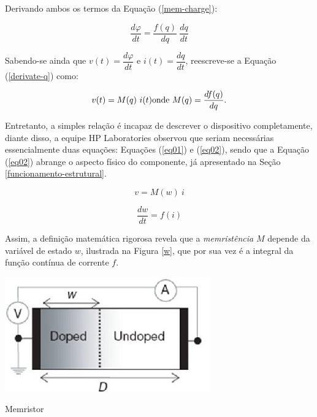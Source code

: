 \documentclass{ceel}
\begin{document}
\begin{multicols}{2}
Derivando ambos os termos da Equação (\ref{mem-charge}):

\begin{equation}\label{derivate-q}
\dfrac{d\varphi}{dt}=\dfrac{f(q)}{dq} \ \dfrac{dq}{dt}
\end{equation}

Sabendo-se ainda que $v(t)=\dfrac{d\varphi}{dt}$ e $i(t)=\dfrac{dq}{dt}$, reescreve-se a Equação (\ref{derivate-q}) como:

\begin{gather}\label{derivate-q}
v(t)=M(q)\ i(t)

\noindent \text{onde $M(q) =\dfrac{df(q)}{dq}$}.
\end{gather}

Entretanto, a simples relação é incapaz de descrever o dispositivo completamente, diante disso, a equipe HP Laboratories observou que seriam necessárias essencialmente duas equações: Equações (\ref{eq01}) e (\ref{eq02}), sendo que a Equação (\ref{eq02}) abrange o aspecto físico do componente, já apresentado na Seção \ref{funcionamento-estrutural}.

\begin{equation}\label{eq01}
v=M( w) \ i
\end{equation}

\begin{equation}\label{eq02}
\dfrac{dw}{dt} =f(i) 
\end{equation}

Assim, a definição matemática rigorosa revela que a \emph{memristência} $M$ depende da variável de estado $w$, ilustrada na Figura \ref{w}, que por sua vez é a integral da função contínua de corrente $f$.

\begin{minipage}[h]{\columnwidth}
\centering
\captionsetup{type=figure}
\includegraphics[width=0.8\columnwidth]{memristor004}
\caption{Memristor}\label{w}
\end{minipage}


\end{multicols}
\end{document}
